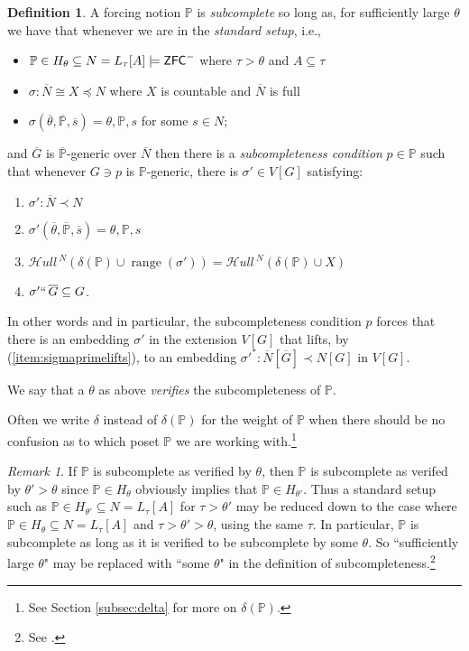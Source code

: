 \documentclass{amsart}
\theoremstyle{definition}
\newtheorem{definition}[theorem]{Definition}
\theoremstyle{remark}
\newtheorem{remark}[theorem]{Remark}
\renewcommand{\P}{\mathbb{P}}
\newcommand{\N}{{\overline{N}}}
\newcommand{\G}{\overline{G}}
\newcommand{\ZFC}{\textup{\ensuremath{\textsf{ZFC}}}}
\DeclareMathOperator{\ran}{range}
\newcommand{\SH}{\mathcal{H}\textit{ull} \,}
\newcommand{\sk}[3]{\SH^{#1}( {#2} \cup {\ran(#3)} ) }
\newcommand{\Sk}[3]{\SH^{#1}( {#2} \cup {#3} ) }
\begin{document}
\begin{definition} \label{definition:SC}
A forcing notion $\P$ is \emph{subcomplete} so long as,
for sufficiently large $\theta$ we have that whenever we are in the \emph{standard setup}, i.e., \begin{itemize}
	\item $\P \in H_\theta \subseteq N = L_\tau[A] \models \ZFC^-$ where $\tau>\theta$ and $A \subseteq \tau$
	\item $\sigma: \N \cong X \preccurlyeq N$ where $X$ is countable and $\N$ is full
	\item $\sigma(\overline \theta, \overline{\P}, \overline s)=\theta, \P, s$ for some $s \in N$;
\end{itemize}
and $\G$ is  $\overline{\P}$-generic over $\N$ then there is a \emph{subcompleteness condition} $p \in \P$ such that whenever $G \ni p$ is $\P$-generic, there is $\sigma' \in V[G]$ satisfying: \begin{enumerate}
	\item $\sigma': \N \prec N$
	\item $\sigma'(\overline \theta, \overline{\P}, \overline s)=\theta, \P, s$
	\item \label{item:skolemcompatibility} $\sk{N}{\delta(\P)}{\sigma'} = \Sk{N}{\delta(\P)}{X}$
	\item \label{item:sigmaprimelifts} $\sigma'``\, \G \subseteq G$.
\end{enumerate}
In other words and in particular, the subcompleteness condition $p$ forces that there is an embedding $\sigma'$ in the extension $V[G]$ that lifts, by (\ref{item:sigmaprimelifts}), to an embedding $\sigma'^*:\N[\G] \prec N[G]$ in $V[G]$.

We say that a $\theta$ as above \emph{verifies} the subcompleteness of $\P$.

Often we write $\delta$ instead of $\delta(\P)$ for the weight of $\P$ when there should be no confusion as to which poset $\P$ we are working with.\footnote{See Section \ref{subsec:delta} for more on $\delta(\P)$.}
\end{definition}

\begin{remark}\label{remark:VerifyingSC} If $\P$ is subcomplete as verified by $\theta$, then $\P$ is subcomplete as verifed by $\theta' > \theta$ since $\P \in H_\theta$ obviously implies that $\P \in H_{\theta'}$. Thus a standard setup such as $\P \in H_{\theta'} \subseteq N=L_\tau[A]$ for $\tau>\theta'$ may be reduced down to the case where $\P \in H_{\theta} \subseteq N=L_\tau[A]$ and $\tau>\theta'>\theta$, using the same $\tau$. 
In particular, $\P$ is subcomplete as long as it is verified to be subcomplete by some $\theta$. So ``sufficiently large $\theta$" may be replaced with ``some $\theta$" in the definition of subcompleteness.\footnote{See \cite[Section 3.1 Lemma 2.4]{Jensen:2012fr}.} \end{remark}
\end{document}
